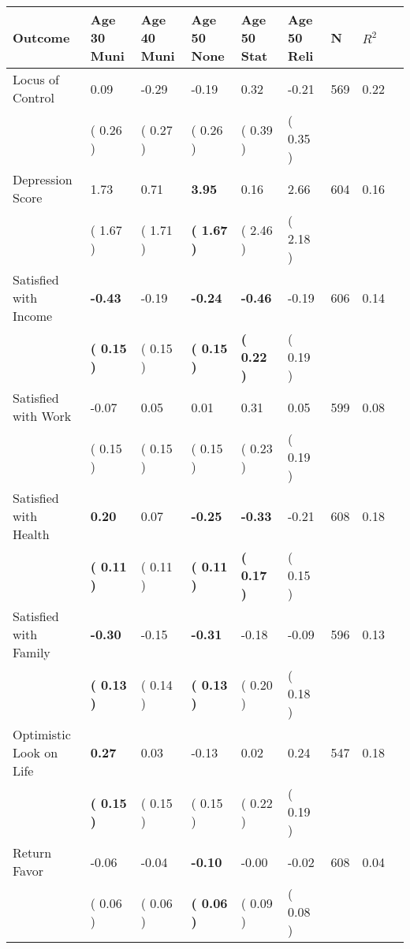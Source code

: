 \begin{tabular}{L{6.2cm} C{1.8cm} C{1.8cm} C{1.8cm} C{1.8cm} C{1.8cm} C{1.8cm} C{0.3cm} C{0.3cm}}
\toprule
 \textbf{Outcome} & \textbf{Age 30 Muni} & \textbf{Age 40 Muni} & \textbf{Age 50 None} & \textbf{Age 50 Stat} & \textbf{Age 50 Reli} & \textbf{N} & \textbf{$ R^2$} \\
\midrule
Locus of Control &      0.09 &     -0.29 &     -0.19 &      0.32 &     -0.21  & 569 &       0.22 \\ 
 & (     0.26 ) & (     0.27 ) & (     0.26 ) & (     0.39 ) & (     0.35 )  & \\
Depression Score &      1.73 &      0.71 & \textbf{     3.95} &      0.16 &      2.66  & 604 &       0.16 \\ 
 & (     1.67 ) & (     1.71 ) & \textbf{(     1.67 )} & (     2.46 ) & (     2.18 )  & \\
Satisfied with Income & \textbf{    -0.43} &     -0.19 & \textbf{    -0.24} & \textbf{    -0.46} &     -0.19  & 606 &       0.14 \\ 
 & \textbf{(     0.15 )} & (     0.15 ) & \textbf{(     0.15 )} & \textbf{(     0.22 )} & (     0.19 )  & \\
Satisfied with Work &     -0.07 &      0.05 &      0.01 &      0.31 &      0.05  & 599 &       0.08 \\ 
 & (     0.15 ) & (     0.15 ) & (     0.15 ) & (     0.23 ) & (     0.19 )  & \\
Satisfied with Health & \textbf{     0.20} &      0.07 & \textbf{    -0.25} & \textbf{    -0.33} &     -0.21  & 608 &       0.18 \\ 
 & \textbf{(     0.11 )} & (     0.11 ) & \textbf{(     0.11 )} & \textbf{(     0.17 )} & (     0.15 )  & \\
Satisfied with Family & \textbf{    -0.30} &     -0.15 & \textbf{    -0.31} &     -0.18 &     -0.09  & 596 &       0.13 \\ 
 & \textbf{(     0.13 )} & (     0.14 ) & \textbf{(     0.13 )} & (     0.20 ) & (     0.18 )  & \\
Optimistic Look on Life & \textbf{     0.27} &      0.03 &     -0.13 &      0.02 &      0.24  & 547 &       0.18 \\ 
 & \textbf{(     0.15 )} & (     0.15 ) & (     0.15 ) & (     0.22 ) & (     0.19 )  & \\
Return Favor &     -0.06 &     -0.04 & \textbf{    -0.10} &     -0.00 &     -0.02  & 608 &       0.04 \\ 
 & (     0.06 ) & (     0.06 ) & \textbf{(     0.06 )} & (     0.09 ) & (     0.08 )  & \\

\end{tabular}
